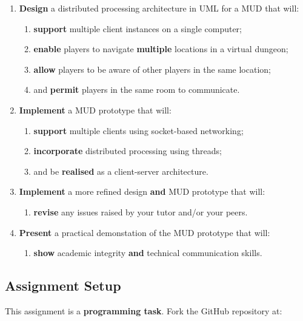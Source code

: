 \documentclass{../../fal_assignment}
\begin{document}
\begin{enumerate}[label=(\Alph*)]
    \item \textbf{Design} a distributed processing architecture in UML for a MUD that will:
    	\begin{enumerate}[label=\roman*.]
    		\item \textbf{support} multiple client instances on a single computer;
    		\item \textbf{enable} players to navigate \textbf{multiple} locations in a virtual dungeon;
    		\item \textbf{allow} players to be aware of other players in the same location;
    		\item and \textbf{permit} players in the same room to communicate.
	\end{enumerate}
    \item \textbf{Implement} a MUD prototype that will:
    	\begin{enumerate}[label=\roman*.]
    		\item \textbf{support} multiple clients using socket-based networking;
    		\item \textbf{incorporate} distributed processing using threads;
     		\item and be \textbf{realised} as a client-server architecture.
	\end{enumerate}
    \item \textbf{Implement} a more refined design \textbf{and} MUD prototype that will:
    	\begin{enumerate}[label=\roman*.]
    		\item \textbf{revise} any issues raised by your tutor and/or your peers.
	\end{enumerate}
    \item \textbf{Present} a practical demonstation of the MUD prototype that will:
    	\begin{enumerate}[label=\roman*.]
    		\item \textbf{show} academic integrity \textbf{and} technical communication skills.
	\end{enumerate}
\end{enumerate}

\subsection*{Assignment Setup}

This assignment is a \textbf{programming task}. Fork the GitHub repository at:
\end{document}
